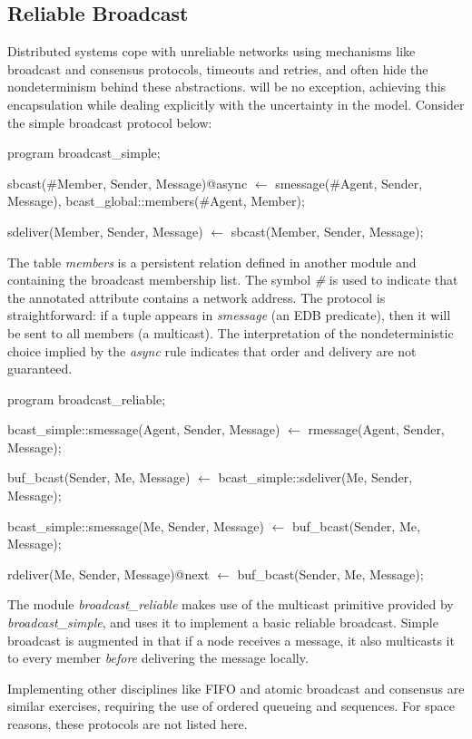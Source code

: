 \subsection{Reliable Broadcast}

Distributed systems cope with unreliable networks using mechanisms like broadcast and consensus protocols, 
timeouts and retries, and often hide the nondeterminism behind these abstractions.  \lang will be no exception,
achieving this encapsulation while dealing explicitly with the uncertainty in the model.  Consider the simple
broadcast protocol below:

\begin{Dedalus}

program broadcast_simple;

sbcast(#Member, Sender, Message)@async \(\leftarrow\)
    smessage(#Agent, Sender, Message),
    bcast_global::members(#Agent, Member);

sdeliver(Member, Sender, Message) \(\leftarrow\)
    sbcast(Member, Sender, Message);

\end{Dedalus}

The table \emph{members} is a persistent relation defined in another module and containing the broadcast 
membership list.  The symbol \emph{\#} is used to indicate that the annotated attribute contains a network
address.  The protocol is straightforward: if a tuple appears in \emph{smessage} (an EDB predicate), then
it will be sent to all members (a multicast).  The interpretation of the nondeterministic choice implied by the
\emph{async} rule indicates that order and delivery are not guaranteed.



\begin{Dedalus}
program broadcast_reliable;

bcast_simple::smessage(Agent, Sender, Message)  \(\leftarrow\)
    rmessage(Agent, Sender, Message);

buf_bcast(Sender, Me, Message)  \(\leftarrow\)
    bcast_simple::sdeliver(Me, Sender, Message);

bcast_simple::smessage(Me, Sender, Message)  \(\leftarrow\)
    buf_bcast(Sender, Me, Message);

rdeliver(Me, Sender, Message)@next  \(\leftarrow\)
    buf_bcast(Sender, Me, Message);

\end{Dedalus}

The module \emph{broadcast\_reliable} makes use of the multicast primitive provided by \emph{broadcast\_simple}, and
uses it to implement a basic reliable broadcast.  Simple broadcast is augmented in that if a node receives a message, it 
also multicasts it to every member \emph{before} delivering the message locally.  

Implementing other disciplines like FIFO and atomic broadcast and consensus are similar exercises, requiring the use of
ordered queueing and sequences.  For space reasons, these protocols are not listed here.